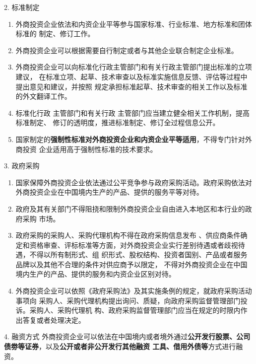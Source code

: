 \documentclass[UTF8,12pt]{ctexart}
\numberwithin{equation}{section} %
\numberwithin{figure}{section}
\numberwithin{table}{section}
\begin{document}
	2. 标准制定
	\begin{enumerate}
		\item 外商投资企业依法和内资企业平等参与国家标准、行业标准、地方标准和团体标准的 制定、修订工作。
		
		\item 外商投资企业可以根据需要自行制定或者与其他企业联合制定企业标准。
		
		\item 外商投资企业可以向标准化行政主管部门和有关行政主管部门提出标准的立项建议， 在标准立项、起草、技术审查以及标准实施信息反馈、评估等过程中提出意见和建议，并按照 规定承担标准起草、技术审查的相关工作以及标准的外文翻译工作。
		
		\item 标准化行政 主管部门和有关行政 主管部门应当建立健全相关工作机制，提高标准制定、 修订的透明度，推进标准制定、修订全过程信息公开。
		
		\item 国家制定的\textbf{强制性标准对外商投资企业和内资企业平等适用}，不得专门针对外商投资 企业适用高于强制性标准的技术要求。
	\end{enumerate}
	
	3. 政府采购 
	\begin{enumerate}
		\item 国家保障外商投资企业依法通过公平竞争参与政府采购活动。政府采购依法对外商投资企业在中国境内生产的产品、提供的服务平等对待。
		
		\item 政府及其有关部门不得阻挠和限制外商投资企业自由进入本地区和本行业的政府采购 市场。
		
		\item 政府采购的采购人、采购代理机构不得在政府采购信息发布 、供应商条件确定和资格审查、评标标准等方面，对外商投资企业实行差别待遇或者歧视待遇，不得以所有制形式、组 织形式、股权结构、投资者国别、产品或者服务品牌以及其他不合理的条件对供应商予以限定， 不得对外商投资企业在中国境内生产的产品、提供的服务和内资企业区别对待。
		
		\item 外商投资企业可以依照《政府采购法》及其实施条例的规定，就政府采购活动事项向 采购人、采购代理机构提出询问、质疑，向政府采购监督管理部门投诉。采购人、采购代理机 构、政府采购监督管理部门应当在规定的时限内作出答复或者处理决定。
	\end{enumerate}
	
	4. 融资方式 外商投资企业可以依法在中国境内或者境外通过\textbf{公开发行股票、公司债劵等证券}，以及\textbf{公开或者非公开发行其他融资 工具、借用外债等}方式进行融资。
	
\end{document}
